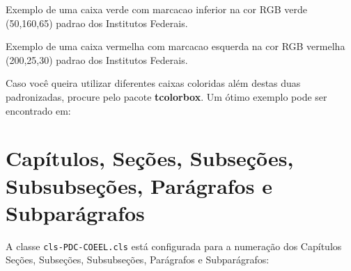 \begin{Codigo}[language=tex, 
    caption=Sintaxe para adicionar Caixas Coloridas no Texto, 
    label=cod:Caixas]
    \begin{CaixaVerde}
        Exemplo de uma caixa verde com marcacao inferior 
        na cor RGB verde (50,160,65) padrao dos Institutos 
        Federais.
    \end{CaixaVerde}
    
    \begin{CaixaVermelha}
        Exemplo de uma caixa vermelha com marcacao esquerda 
        na cor RGB vermelha (200,25,30) padrao dos Institutos 
        Federais.
    \end{CaixaVermelha}
\end{Codigo}



\vspace{1cm}
Caso você queira utilizar diferentes caixas coloridas além destas duas padronizadas, procure pelo pacote {\bf tcolorbox}. Um ótimo exemplo pode ser encontrado em:


\clearpage\newpage\pagebreak

\section{Capítulos, Seções, Subseções, Subsubseções, Parágrafos e Subparágrafos}

A classe \verb|cls-PDC-COEEL.cls| está configurada para a numeração dos
Capítulos Seções, Subseções, Subsubseções, Parágrafos e Subparágrafos:

